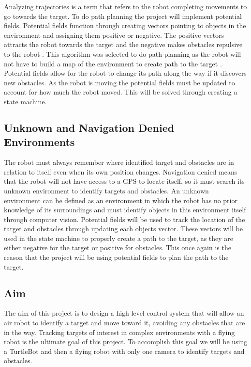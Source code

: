 \documentclass{article}
\begin{document}
	Analyzing trajectories is a term that refers to the robot completing movements to go towards the target. To do path planning the project will implement potential fields. Potential fields function through creating vectors pointing to objects in the environment and assigning them positive or negative. The positive vectors attracts the robot towards the target and the negative makes obstacles repulsive to the robot \cite{hwang1992potential}. This algorithm was selected to do path planning as the robot will not have to build a map of the environment to create path to the target \cite{bortoff2000path}. Potential fields allow for the robot to change its path along the way if it discovers new obstacles. As the robot is moving the potential fields must be updated to account for how much the robot moved. This will be solved through creating a state machine. 

	\subsection{Unknown and Navigation Denied Environments}

	The robot must always remember where identified target and obstacles are in relation to itself even when its own position changes. Navigation denied means that the robot will not have access to a GPS to locate itself, so it must search its unknown environment to identify targets and obstacles. An unknown environment can be defined as an environment in which the robot has no prior knowledge of its surroundings and must identify objects in this environment itself through computer vision. Potential fields will be used to track the location of the target and obstacles through updating each objects vector. These vectors will be used in the state machine to properly create a path to the target, as they are either negative for the target or positive for obstacles. This once again is the reason that the project will be using potential fields to plan the path to the target. 

	\subsection{Aim}
	
	The aim of this project is to design a high level control system that will allow an air robot to identify a target and move toward it, avoiding any obstacles that are in the way. Tracking targets of interest in complex environments with a flying robot is the ultimate goal of this project. To accomplish this goal we will be using a TurtleBot and then a flying robot with only one camera to identify targets and obstacles. 
\end{document}
